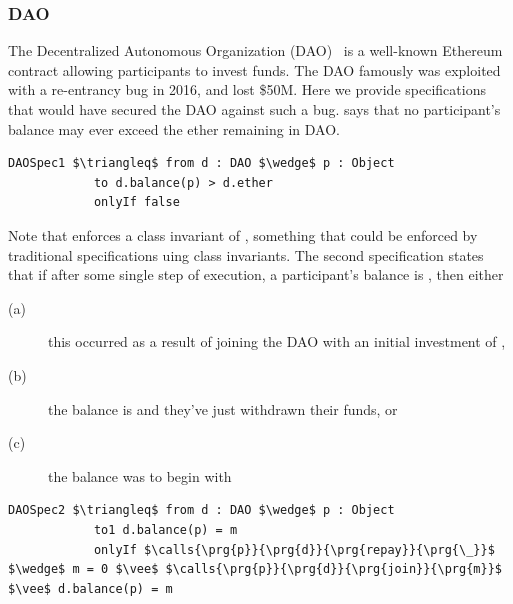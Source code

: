 \subsubsection{DAO}
The Decentralized Autonomous Organization (DAO)~\cite{Dao}  is a well-known Ethereum contract allowing 
participants to invest funds. The DAO famously was exploited with a re-entrancy bug in 2016, 
and lost \$50M. Here we provide specifications that would have secured the DAO against such a 
bug.  says that no participant's balance may ever exceed the ether remaining 
in DAO.
\begin{lstlisting}[language = Chainmail, mathescape=true, frame=lines]
DAOSpec1 $\triangleq$ from d : DAO $\wedge$ p : Object
            to d.balance(p) > d.ether
            onlyIf false
\end{lstlisting}
Note that  enforces a class invariant of , something that could be enforced
by traditional specifications uing class invariants.
The second specification  states that if after some single step of execution, a participant's balance is , then 
either 
\begin{description}
\item[(a)] this occurred as a result of joining the DAO with an initial investment of , 
\item[(b)] the balance is  and they've just withdrawn their funds, or 
\item[(c) ]the balance was  to begin with
\end{description}
\begin{lstlisting}[language = Chainmail, mathescape=true, frame=lines]
DAOSpec2 $\triangleq$ from d : DAO $\wedge$ p : Object
            to1 d.balance(p) = m
            onlyIf $\calls{\prg{p}}{\prg{d}}{\prg{repay}}{\prg{\_}}$ $\wedge$ m = 0 $\vee$ $\calls{\prg{p}}{\prg{d}}{\prg{join}}{\prg{m}}$ $\vee$ d.balance(p) = m
\end{lstlisting}
